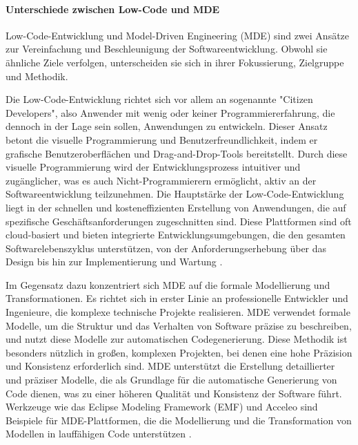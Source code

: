 \paragraph{Unterschiede zwischen Low-Code und MDE}
Low-Code-Entwicklung und Model-Driven Engineering (MDE) sind zwei Ansätze zur Vereinfachung und Beschleunigung der 
Softwareentwicklung. Obwohl sie ähnliche Ziele verfolgen, unterscheiden sie sich in ihrer Fokussierung, Zielgruppe und Methodik.

Die Low-Code-Entwicklung richtet sich vor allem an sogenannte "Citizen Developers", also Anwender mit wenig 
oder keiner Programmiererfahrung, die dennoch in der Lage sein sollen, Anwendungen zu entwickeln. Dieser Ansatz 
betont die visuelle Programmierung und Benutzerfreundlichkeit, indem er grafische Benutzeroberflächen und Drag-and-Drop-Tools 
bereitstellt. Durch diese visuelle Programmierung wird der Entwicklungsprozess intuitiver und zugänglicher, was es auch 
Nicht-Programmierern ermöglicht, aktiv an der Softwareentwicklung teilzunehmen. Die Hauptstärke der Low-Code-Entwicklung 
liegt in der schnellen und kosteneffizienten Erstellung von Anwendungen, die auf spezifische Geschäftsanforderungen 
zugeschnitten sind. Diese Plattformen sind oft cloud-basiert und bieten integrierte Entwicklungsumgebungen, die den 
gesamten Softwarelebenszyklus unterstützen, von der Anforderungserhebung über das Design bis hin zur Implementierung 
und Wartung \cite{Cabot_2020}.

Im Gegensatz dazu konzentriert sich MDE auf die formale Modellierung und Transformationen. Es richtet sich in erster 
Linie an professionelle Entwickler und Ingenieure, die komplexe technische Projekte realisieren. MDE verwendet formale 
Modelle, um die Struktur und das Verhalten von Software präzise zu beschreiben, und nutzt diese Modelle zur automatischen 
Codegenerierung. Diese Methodik ist besonders nützlich in großen, komplexen Projekten, bei denen eine hohe Präzision und 
Konsistenz erforderlich sind. MDE unterstützt die Erstellung detaillierter und präziser Modelle, die als Grundlage für 
die automatische Generierung von Code dienen, was zu einer höheren Qualität und Konsistenz der Software führt. Werkzeuge 
wie das Eclipse Modeling Framework (EMF) und Acceleo sind Beispiele für MDE-Plattformen, die die Modellierung und die 
Transformation von Modellen in lauffähigen Code unterstützen \cite{di2022low}.

